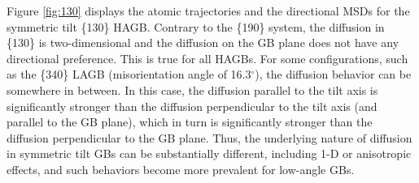 \documentclass{elsarticle}
\begin{document}
Figure \ref{fig:130} displays the atomic trajectories and the directional MSDs for the symmetric tilt \{130\} HAGB. Contrary to the \{190\} system, the diffusion in \{130\} is two-dimensional and the diffusion on the GB plane does not have any directional preference. This is true for all HAGBs. For some configurations, such as the \{340\} LAGB (misorientation angle of 16.3$^{\circ}$), the diffusion behavior can be somewhere in between. In this case, the diffusion parallel to the tilt axis is significantly stronger than the diffusion perpendicular to the tilt axis (and parallel to the GB plane), which in turn is significantly stronger than the diffusion perpendicular to the GB plane. Thus, the underlying nature of diffusion in symmetric tilt GBs can be substantially different, including 1-D or anisotropic effects, and such behaviors become more prevalent for low-angle GBs.
\end{document}
